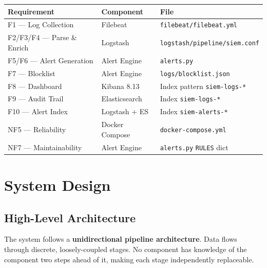 \documentclass[12pt,a4paper]{article}
\newcommand{\file}[1]{\texttt{\color{accent}#1}}
\newcommand{\field}[1]{\texttt{#1}}
\begin{document}
\begin{center}
\begin{tabular}{p{4.5cm}p{4cm}p{5cm}}
  \toprule
  \textbf{Requirement} & \textbf{Component} & \textbf{File} \\
  \midrule
  F1 — Log Collection         & Filebeat            & \file{filebeat/filebeat.yml} \\
  F2/F3/F4 — Parse \& Enrich  & Logstash            & \file{logstash/pipeline/siem.conf} \\
  F5/F6 — Alert Generation    & Alert Engine        & \file{alerts.py} \\
  F7 — Blocklist              & Alert Engine        & \file{logs/blocklist.json} \\
  F8 — Dashboard              & Kibana 8.13         & Index pattern \field{siem-logs-*} \\
  F9 — Audit Trail            & Elasticsearch       & Index \field{siem-logs-*} \\
  F10 — Alert Index           & Logstash + ES       & Index \field{siem-alerts-*} \\
  NF5 — Reliability           & Docker Compose      & \file{docker-compose.yml} \\
  NF7 — Maintainability       & Alert Engine        & \file{alerts.py} \texttt{RULES} dict \\
  \bottomrule
\end{tabular}
\end{center}

\newpage

\section{System Design}

\subsection{High-Level Architecture}

The system follows a \textbf{unidirectional pipeline architecture}. Data flows
through discrete, loosely-coupled stages. No component has knowledge of the
component two steps ahead of it, making each stage independently replaceable.
\end{document}
